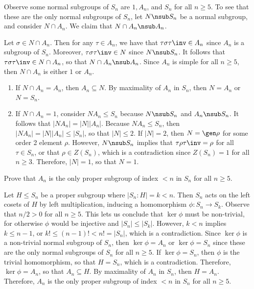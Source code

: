 \begin{sol}
	Observe some normal subgroups of $S_n$ are $1, A_n$, and $S_n$ for all $n \geq 5$. To see that these are the only normal subgroups of $S_n$, let $N \nsub S_n$ be a normal subgroup, and consider $N \cap A_n$. We claim that $N \cap A_n \nsub A_n$.

	Let $\sigma \in N \cap A_n$. Then for any $\tau \in A_n$, we have that $\tau \sigma \tau\inv \in A_n$ since $A_n$ is a subgroup of $S_n$. Moreover, $\tau \sigma \tau\inv \in N$ since $N \nsub S_n$. It follows that $\tau \sigma \tau\inv \in N \cap A_n$, so that $N \cap A_n \nsub A_n$. Since $A_n$ is simple for all $n \geq 5$, then $N \cap A_n$ is either $1$ or $A_n$.
	\begin{enumerate}
		\item If $N \cap A_n = A_n$, then $A_n \subseteq N$. By maximality of $A_n$ in $S_n$, then $N = A_n$ or $N = S_n$.
		\item If $N \cap A_n = 1$, consider $NA_n \leq S_n$ because $N \nsub S_n$ and $A_n \nsub S_n$. It follows that $|NA_n| = |N||A_n|$. Because $NA_n \leq S_n$, then $|NA_n| = |N||A_n| \leq |S_n|$, so that $|N| \leq 2$. If $|N| = 2$, then $N = \gen\rho$ for some order 2 element $\rho$. However, $N \nsub S_n$ implies that $\tau\rho\tau\inv = \rho$ for all $\tau \in S_n$, or that $\rho \in Z(S_n)$, which is a contradiction since $Z(S_n) = 1$ for all $n \geq 3$. Therefore, $|N| = 1$, so that $N = 1$. \qh
	\end{enumerate}
\end{sol}

\begin{exercise}\label{ex4.6.3}
	Prove that $A_n$ is the only proper subgroup of index $< n$ in $S_n$ for all $n \geq 5$.
\end{exercise}

\begin{sol}
	Let $H \leq S_n$ be a proper subgroup where $|S_n : H| = k < n$. Then $S_n$ acts on the left cosets of $H$ by left multiplication, inducing a homomorphism $\phi : S_n \to S_k$. Observe that $n/2 > 0$ for all $n \geq 5$. This lets us conclude that $\ker\phi$ must be non-trivial, for otherwise $\phi$ would be injective and $|S_n| \leq |S_k|$. However, $k < n$ implies $k \leq n - 1$, or $k! \leq (n - 1)! < n! = |S_n|$, which is a contradiction. Since $\ker\phi$ is a non-trivial normal subgroup of $S_n$, then $\ker\phi = A_n$ or $\ker\phi = S_n$ since these are the only normal subgroups of $S_n$ for all $n \geq 5$. If $\ker\phi = S_n$, then $\phi$ is the trivial homomorphism, so that $H = S_n$, which is a contradiction. Therefore, $\ker\phi = A_n$, so that $A_n \subseteq H$. By maximality of $A_n$ in $S_n$, then $H = A_n$. Therefore, $A_n$ is the only proper subgroup of index $< n$ in $S_n$ for all $n \geq 5$.
\end{sol}

